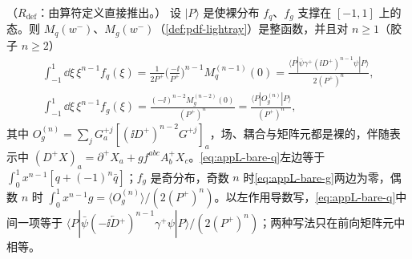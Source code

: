 \begin{proposition}\label{prop:appL-bare}
（$R_{\mathrm{def}}$：由算符定义直接推出。）
设 $|P\rangle$ 是使裸分布 $f_q$、$f_g$ 支撑在 $[-1,1]$ 上的态。则 $M_q(w^-)$、$M_g(w^-)$（\cref{def:pdf-lightray}）是整函数，并且对 $n\ge1$（胶子 $n\ge2$）
\begin{gather}
\int_{-1}^1\dd\xi\,\xi^{n-1}f_q(\xi)=\frac{1}{2P^+}\Big(\frac{-\ii}{P^+}\Big)^{n-1}M_q^{(n-1)}(0)=\frac{\langle P|\bar\psi\gamma^+(\ii D^+)^{n-1}\psi|P\rangle}{2(P^+)^n},\label{eq:appL-bare-q}\\
\int_{-1}^1\dd\xi\,\xi^{n-1}f_g(\xi)=\frac{(-\ii)^{n-2}M_g^{(n-2)}(0)}{(P^+)^n}=\frac{\langle P|O^{(n)}_g|P\rangle}{(P^+)^n},\label{eq:appL-bare-g}
\end{gather}
其中 $O^{(n)}_g=\sum_jG^{+j}_a[(\ii D^+)^{n-2}G^{+j}]_a$，场、耦合与矩阵元都是裸的，伴随表示中 $(D^+X)_a=\partial^+X_a+gf^{abc}A^+_bX_c$。\cref{eq:appL-bare-q}左边等于 $\int_0^1x^{n-1}[q+(-1)^n\bar q]$；$f_g$ 是奇分布，奇数 $n$ 时\cref{eq:appL-bare-g}两边为零，偶数 $n$ 时 $\int_0^1x^{n-1}g=\langle O^{(n)}_g\rangle/(2(P^+)^n)$。以左作用导数写，\cref{eq:appL-bare-q}中间一项等于 $\langle P|\bar\psi(-\ii\overleftarrow{D}{}^+)^{n-1}\gamma^+\psi|P\rangle/(2(P^+)^n)$；两种写法只在前向矩阵元中相等。
\end{proposition}

